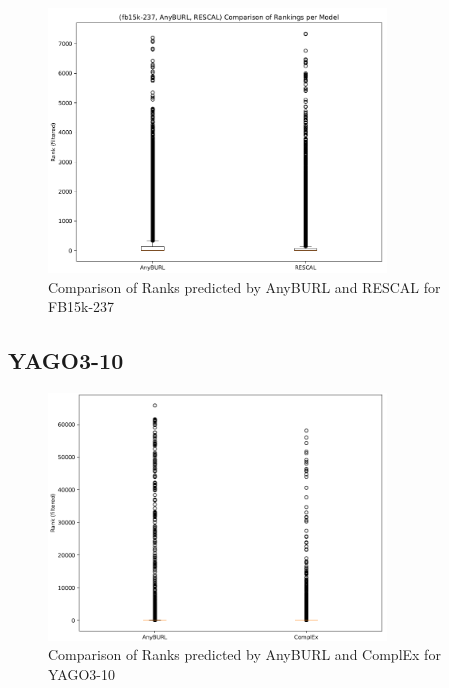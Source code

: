 \begin{figure}[H]
\centering
\includegraphics[width=0.8\textwidth]{images/ranks_anyburl_rescal_fb15k.png}
\caption{Comparison of Ranks predicted by AnyBURL and RESCAL for FB15k-237}
\label{fig:ranks_anyburl_rescal_fb15k}
\end{figure}

\subsection{YAGO3-10}

\begin{figure}[H]
\centering
\includegraphics[width=0.8\textwidth]{images/ranks_anyburl_complex_yago.png}
\caption{Comparison of Ranks predicted by AnyBURL and ComplEx for YAGO3-10}
\label{fig:ranks_anyburl_complex_yago}
\end{figure}